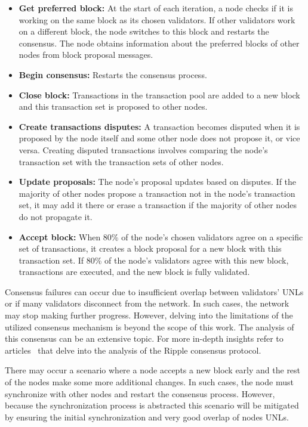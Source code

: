 \begin{itemize}
    \item \textbf{Get preferred block:} At the start of each iteration, a node checks if it is working on the same block as its chosen validators. If other validators work on a different block, the node switches to this block and restarts the consensus. The node obtains information about the preferred blocks of other nodes from block proposal messages.
    \item \textbf{Begin consensus:} Restarts the consensus process. 
    \item \textbf{Close block:} Transactions in the transaction pool are added to a new block and this transaction set is proposed to other nodes.
    \item \textbf{Create transactions disputes:} A transaction becomes disputed when it is proposed by the node itself and some other node does not propose it, or vice versa. Creating disputed transactions involves comparing the node's transaction set with the transaction sets of other nodes.
    \item \textbf{Update proposals:} The node's proposal updates based on disputes. If the majority of other nodes propose a transaction not in the node's transaction set, it may add it there or erase a transaction if the majority of other nodes do not propagate it.
    \item \textbf{Accept block:} When 80\% of the node's chosen validators agree on a specific set of transactions, it creates a block proposal for a new block with this transaction set. If 80\% of the node's validators agree with this new block, transactions are executed, and the new block is fully validated.
\end{itemize}

Consensus failures can occur due to insufficient overlap between validators' UNLs or if many validators disconnect from the network. In such cases, the network may stop making further progress. However, delving into the limitations of the utilized consensus mechanism is beyond the scope of this work. The analysis of this consensus can be an extensive topic. For more in-depth insights refer to articles~\cite{XRP.analysis, xrp.consensus.analysis} that delve into the analysis of the Ripple consensus protocol.

There may occur a scenario where a node accepts a new block early and the rest of the nodes make some more additional changes. In such cases, the node must synchronize with other nodes and restart the consensus process. However, because the synchronization process is abstracted this scenario will be mitigated by ensuring the initial synchronization and very good overlap of nodes UNLs.

